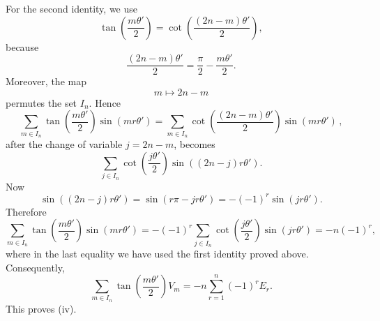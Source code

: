 \documentclass[a4paper,reqno]{amsart}
\theoremstyle{plain} %
\theoremstyle{definition} %
\theoremstyle{remark} %
\newcommand{\1}{\mathds{1}}   %
\begin{document}
For the second identity, we use
\[
\tan\left(\frac{m\theta'}2\right)
=
\cot\left(\frac{(2n-m)\theta'}2\right),
\]
because
\[
\frac{(2n-m)\theta'}2
=
\frac{\pi}{2}-\frac{m\theta'}2.
\]
Moreover, the map
\[
m\longmapsto 2n-m
\]
permutes the set $I_n$. Hence
\[
\sum_{m\in I_n}
\tan\left(\frac{m\theta'}2\right)
\sin(mr\theta')
 =
\sum_{m\in I_n}
\cot\left(\frac{(2n-m)\theta'}2\right)
\sin(mr\theta') \, ,
\]
after the change of variable $j=2n-m$,  becomes
\[
\sum_{j\in I_n}
\cot\left(\frac{j\theta'}2\right)
\sin((2n-j)r\theta').
\]
Now
\[
\sin((2n-j)r\theta')
=
\sin(r\pi-jr\theta')
=
-(-1)^r\sin(jr\theta').
\]
Therefore
\[
\sum_{m\in I_n}
\tan\left(\frac{m\theta'}2\right)
\sin(mr\theta')
=
-(-1)^r
\sum_{j\in I_n}
\cot\left(\frac{j\theta'}2\right)
\sin(jr\theta')
=
-n(-1)^r,
\]
where in the last equality we have used the first identity proved above.
Consequently,
\[
\sum_{m\in I_n}
\tan\left(\frac{m\theta'}2\right)V_m
=
-n\sum_{r=1}^n(-1)^rE_r.
\]
This proves (iv).




\end{document}
